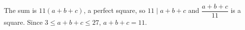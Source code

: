 The sum is $11(a+b+c)$, a perfect square, so $11\mid a+b+c$ and $\dfrac{a+b+c}{11}$ is a square. Since $3\le a+b+c\le27$, $a+b+c=\boxed{11}$.
